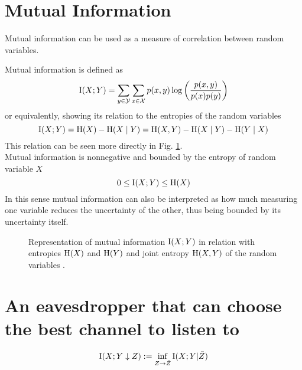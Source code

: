 \label{ch:four}
\section{Mutual Information}
    Mutual information can be used as a measure of correlation between random variables. 
	
	Mutual information is defined as
	\begin{equation}
		\operatorname{I}(X;Y) = \sum_{y\in\mathcal{Y}}\sum_{x\in\mathcal{X}} p(x,y) \log\left(\frac{p(x,y)}{p(x)p(y)}\right) 
	\end{equation}
	or equivalently, showing its relation to the entropies of the random variables
	\begin{equation}
		\operatorname{I}(X;Y) = \operatorname{H}(X) - \operatorname{H}(X\mid Y) = \operatorname{H}(X,Y) - \operatorname{H}(X\mid Y) - \operatorname{H}(Y\mid X)
	\end{equation}
	This relation can be seen more directly in Fig. \ref{fig:mutual_info}.\\
	Mutual information is nonnegative and bounded by the entropy of random variable $X$
	\begin{equation}
		0 \leq \operatorname{I}(X;Y) \leq \operatorname{H}(X)
	\end{equation}
	In this sense mutual information can also be interpreted as how much measuring one variable reduces the uncertainty of the other, thus being bounded by its uncertainty itself.
	
	\begin{figure}[h]
		\centering
		
		\caption{Representation of mutual information $\operatorname{I}(X;Y)$ in relation with entropies $\operatorname{H}(X)$ and $\operatorname{H}(Y)$ and joint entropy $\operatorname{H}(X,Y)$ of the random variables .
		\label{fig:mutual_info}}
	\end{figure}	
\section{An eavesdropper that can choose the best channel to listen to}
   
    \begin{equation} \label{intrininfo}
    	\operatorname{I}(X;Y\downarrow Z):= \inf_{Z\rightarrow \bar{Z}} \operatorname{I}(X;Y | \bar{Z})
    \end{equation}
